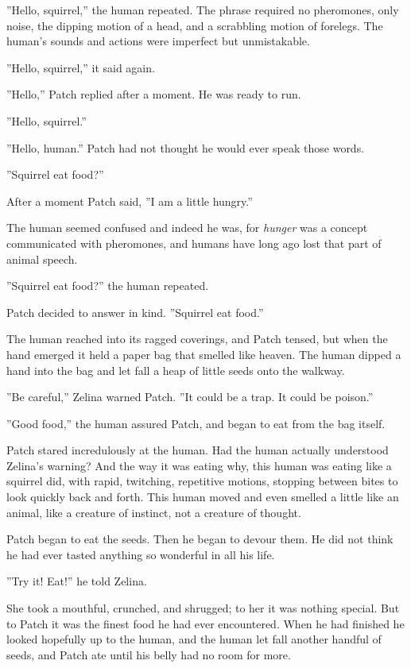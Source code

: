 \documentclass[11pt]{article}
\begin{document}
''Hello, squirrel,'' the human repeated. The phrase required no pheromones, only noise, the dipping motion of a head, and a scrabbling motion of forelegs. The human's sounds and actions were imperfect but unmistakable.\par
''Hello, squirrel,'' it said again.\par
''Hello,'' Patch replied after a moment. He was ready to run.\par
''Hello, squirrel.''\par
''Hello, human.'' Patch had not thought he would ever speak those words.\par
''Squirrel eat food?''\par
After a moment Patch said, ''I am a little hungry.''\par
The human seemed confused %
 and indeed he was, for {\it hunger} was a concept communicated with pheromones, and humans have long ago lost that part of animal speech.\par
''Squirrel eat food?'' the human repeated.\par
Patch decided to answer in kind. ''Squirrel eat food.''\par
The human reached into its ragged coverings, and Patch tensed, but when the hand emerged it held a paper bag that smelled like heaven. The human dipped a hand into the bag and let fall a heap of little seeds onto the walkway.\par
''Be careful,'' Zelina warned Patch. ''It could be a trap. It could be poison.''\par
''Good food,'' the human assured Patch, and began to eat from the bag itself.\par
Patch stared incredulously at the human. Had the human actually understood Zelina's warning? And the way it was eating %
 why, this human was eating like a squirrel did, with rapid, twitching, repetitive motions, stopping between bites to look quickly back and forth. This human moved and even smelled a little like an animal, like a creature of instinct, not a creature of thought.\par
Patch began to eat the seeds. Then he began to devour them. He did not think he had ever tasted anything so wonderful in all his life.\par
''Try it! Eat!'' he told Zelina.\par
She took a mouthful, crunched, and shrugged; to her it was nothing special. But to Patch it was the finest food he had ever encountered. When he had finished he looked hopefully up to the human, and the human let fall another handful of seeds, and Patch ate until his belly had no room for more.\par
\end{document}
